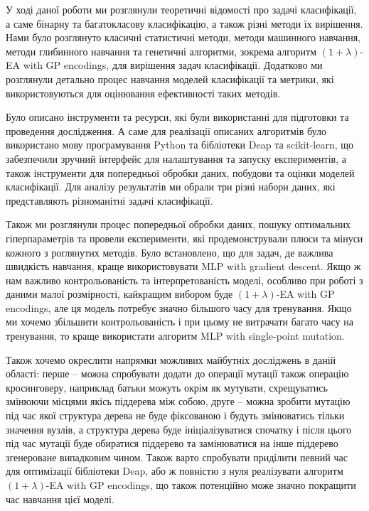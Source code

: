 У ході даної роботи ми розглянули теоретичні відомості про задачі класифікації, а саме бінарну та багатокласову класифікацію, а також різні методи їх вирішення. Нами було розглянуто класичні статистичні методи, методи машинного навчання, методи глибинного навчання та генетичні алгоритми, зокрема алгоритм $(1+\lambda)$-EA with GP encodings, для вирішення задач класифікації. Додатково ми розглянули детально процес навчання моделей класифікації та метрики, які використовуються для оцінювання ефективності таких методів.

Було описано інструменти та ресурси, які були використанні для підготовки та проведення дослідження. А саме для реалізації описаних алгоритмів було використано мову програмування Python та бібліотеки Deap та scikit-learn, що забезпечили зручний інтерфейс для налаштування та запуску експериментів, а також інструменти для попередньої обробки даних, побудови та оцінки моделей класифікації. Для аналізу результатів ми обрали три різні набори даних, які представляють різноманітні задачі класифікації.

Також ми розглянули процес попередньої обробки даних, пошуку оптимальних гіперпараметрів та провели експерименти, які продемонстрували плюси та мінуси кожного з роглянутих методів. Було встановлено, що для задач, де важлива швидкість навчання, краще використовувати MLP with gradient descent. Якщо ж нам важливо контрольованість та інтерпретованість моделі, особливо при роботі з даними малої розмірності, кайкращим вибором буде $(1+\lambda)$-EA with GP encodings, але ця модель потребує значно більшого часу для тренування. Якщо ми хочемо збільшити контрольованість і при цьому не витрачати багато часу на тренування, то краще використати алгоритм MLP with single-point mutation.

Також хочемо окреслити напрямки можливих майбутніх досліджень в даній області: перше -- можна спробувати додати до операції мутації також операцію кросинговеру, наприклад батьки можуть окрім як мутувати, схрещуватись змінюючи місцями якісь піддерева між собою, друге -- можна зробити мутацію під час якої структура дерева не буде фіксованою і будуть змінюватись тільки значення вузлів, а структура дерева буде ініціалізуватися спочатку і після цього під час мутації буде обиратися піддерево та замінюватися на інше піддерево згенероване випадковим чином. Також варто спробувати приділити певний час для оптимізації бібліотеки Deap, або ж повністю з нуля реалізувати алгоритм $(1+\lambda)$-EA with GP encodings, що також потенційно може значно покращити час навчання цієї моделі.